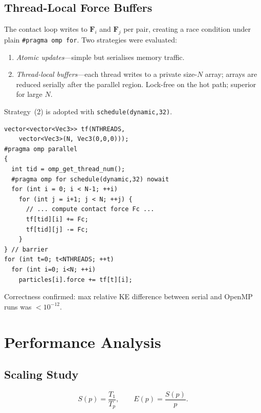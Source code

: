 \documentclass[10pt,twocolumn]{article}
\newcommand{\vv}[1]{\boldsymbol{#1}}
\begin{document}
\subsection{Thread-Local Force Buffers}

The contact loop writes to $\vv{F}_i$ and $\vv{F}_j$ per pair, creating
a race condition under plain \texttt{\#pragma omp for}.
Two strategies were evaluated:

\begin{enumerate}\setlength\itemsep{0pt}
  \item \textit{Atomic updates}---simple but serialises memory traffic.
  \item \textit{Thread-local buffers}---each thread writes to a private
        size-$N$ array; arrays are reduced serially after the parallel
        region.  Lock-free on the hot path; superior for large $N$.
\end{enumerate}

Strategy~(2) is adopted with \texttt{schedule(dynamic,32)}.

\begin{lstlisting}[caption={OpenMP contact loop (simplified).},label={lst:omp}]
vector<vector<Vec3>> tf(NTHREADS,
    vector<Vec3>(N, Vec3(0,0,0)));
#pragma omp parallel
{
  int tid = omp_get_thread_num();
  #pragma omp for schedule(dynamic,32) nowait
  for (int i = 0; i < N-1; ++i)
    for (int j = i+1; j < N; ++j) {
      // ... compute contact force Fc ...
      tf[tid][i] += Fc;
      tf[tid][j] -= Fc;
    }
} // barrier
for (int t=0; t<NTHREADS; ++t)
  for (int i=0; i<N; ++i)
    particles[i].force += tf[t][i];
\end{lstlisting}

Correctness confirmed: max relative KE difference between serial and
OpenMP runs was $<10^{-12}$.

\section{Performance Analysis}\label{sec:perf}

\subsection{Scaling Study}

\begin{equation}
  S(p)=\frac{T_1}{T_p},\qquad E(p)=\frac{S(p)}{p}.
\end{equation}
\end{document}
